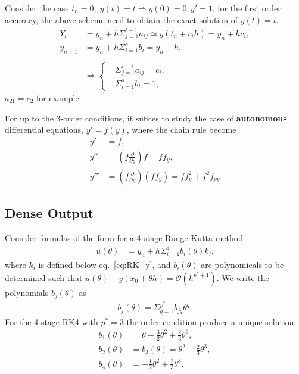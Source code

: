 \documentclass[prd,aps,a4paper,superscriptaddress,onecolumn,footinbib]{revtex4}
\begin{document}
Consider the case
$t_n=0,\; y(t)=t \Rightarrow y(0)=0, y'=1$,
for the first order accuracy, the above scheme need to obtain the exact
solution of $y(t)=t$.
\begin{align}
    Y_i
    &=y_n+h\Sigma_{j=1}^{i-1} a_{ij} \simeq y(t_n+c_ih) = y_n+hc_i, \\
    y_{n+1}
    &=y_n + h\Sigma_{i=1}^sb_i = y_n + h.
    \\~\nonumber\\
    &\Rightarrow
    \left\{
        \begin{matrix}
            &\Sigma_{j=1}^{i-1}a_{ij} = c_i, \\
            &\Sigma_{i=1}^sb_i = 1,
        \end{matrix}
    \right.
\end{align}
$a_{21}=c_2$ for example.

For up to the 3-order conditions, it sufices to study the case of \textbf{autonomous} differential equations, $y'=f(y)$, where the chain rule become
\begin{align}
    y'&=f, \\
    y''&=(f\frac{\partial}{\partial y})f=ff_y, \\
    y'''&=(f\frac{\partial}{\partial y})(f f_y)=ff_y^2+f^2f_{yy}
\end{align}

\subsection{Dense Output}

Consider formulas of the form for a 4-stage Runge-Kutta method \cite{alexander1990solving}
\begin{align}
    u(\theta)
    &=y_n+h\Sigma_{i=1}^4b_i(\theta)k_i.
\end{align}
where $k_i$ is defined below eq.~\eqref{eq:RK_y},
and $b_i(\theta)$ are polynomicals to be determined such that
$u(\theta)-y(x_0+\theta h)=\mathcal{O}(h^{p^*+1})$.
We write the polynomials $b_j(\theta)$ as
\begin{align}
    b_j(\theta)=\Sigma_{q=1}^{p^*}b_{jq}\theta^q.
\end{align}
For the 4-stage RK4 with $p^*=3$ the order condition produce a unique solution
\begin{align}
    b_1(\theta)&=\theta-\frac{3}{2}\theta^2+\frac{2}{3}\theta^3, \\
    b_2(\theta)&=b_3(\theta)=\theta^2-\frac{2}{3}\theta^3, \\
    b_4(\theta)&=-\frac{1}{2}\theta^2+\frac{2}{3}\theta^3.
\end{align}
\end{document}
